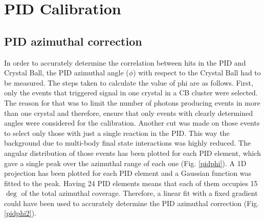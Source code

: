 \section{PID Calibration}

\subsection{PID azimuthal correction}

\indent In order to accurately determine the correlation between hits in the PID and Crystal Ball, the PID azimuthal angle ($\phi$) with respect to the Crystal Ball had to be measured. The steps taken to calculate the value of phi are as follows.
\indent First, only the events that triggered signal in one crystal in a CB cluster were selected. The reason for that was to limit the number of photons producing events in more than one crystal and therefore, ensure that only events with clearly determined angles were considered for the calibration. Another cut was made on those events to select only those with just a single reaction in the PID. This way the background due to multi-body final state interactions was highly reduced.
\indent The angular distribution of those events has been plotted for each PID element, which gave a single peak over the azimuthal range of each one (Fig. \ref{pidphi}). A 1D projection has been plotted for each PID element and a Gaussian function was fitted to the peak. Having 24 PID elements means that each of them occupies 15$\deg$ of the total azimuthal coverage. Therefore, a linear fit with a fixed gradient could have been used to accurately determine the PID azimuthal correction (Fig. \ref{pidphi2}).

